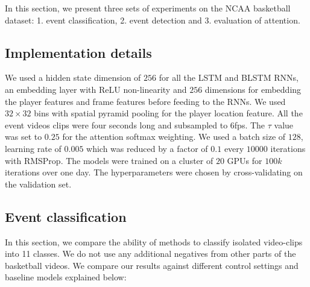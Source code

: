 In this section, we present three sets of experiments on the NCAA basketball
dataset: 1. event classification, 2. event detection and 3. evaluation of
attention.

\subsection{Implementation details}

We used a hidden state dimension of $256$ for all the LSTM and BLSTM RNNs, an
embedding layer with ReLU non-linearity and $256$ dimensions for embedding the
player features and frame features before feeding to the RNNs.  We used $32
\times 32$ bins with spatial pyramid pooling for the player location feature.
All the event videos clips were four seconds long and subsampled to 6fps.  The
$\tau$ value was set to $0.25$ for the attention softmax weighting. We used a
batch size of $128$, learning rate of $0.005$ which was reduced by a factor of
$0.1$ every $10000$ iterations with RMSProp\cite{RMSProp}. The models were
trained on a cluster of $20$ GPUs for $100k$ iterations over one day.  The
hyperparameters were chosen by cross-validating on the validation set.

\subsection{Event classification}

In this section, we compare the ability of methods to classify isolated
video-clips into 11 classes.  We do not use any additional
negatives from other parts of the basketball videos.  We compare our results
against different control settings and baseline models explained below:

